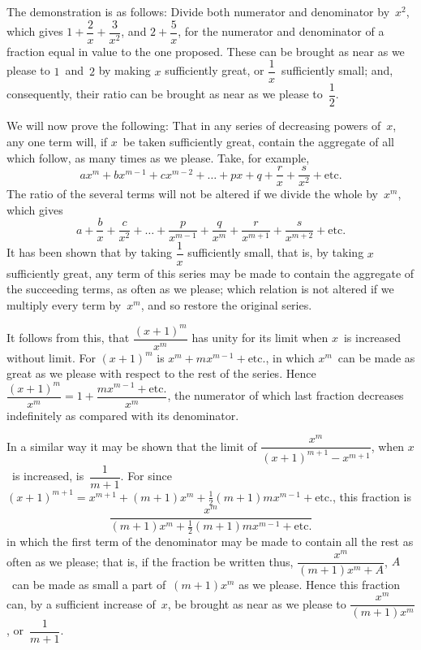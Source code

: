 \documentclass[12pt]{book}[2005/09/16]
\newcommand{\Pagelabel}[1]{\phantomsection\label{page:#1}}
\newcommand{\PageSep}[1]{\Pagelabel{#1}\ignorespaces}
\renewcommand{\etc}{\text{etc}}
\renewcommand{\(}{{\upshape(}}
\renewcommand{\)}{{\upshape)}}
\begin{document}
The demonstration is as follows: Divide both
numerator and denominator by~$x^{2}$, which gives $1 + \dfrac{2}{x} + \dfrac{3}{x^{2}}$,
and $2 + \dfrac{5}{x}$, for the numerator and denominator
of a fraction equal in value to the one proposed.
These can be brought as near as we please to $1$~and~$2$
by making $x$ sufficiently great, or $\dfrac{1}{x}$~sufficiently small;
and, consequently, their ratio can be brought as near
as we please to~$\dfrac{1}{2}$.

We will now prove the following: That in any
series of decreasing powers of~$x$, any one term will, if
$x$~be taken sufficiently great, contain the aggregate of
all which follow, as many times as we please. Take,
for example,
\[
ax^{m} + bx^{m-1} + cx^{m-2} + \dots + px + q
  + \frac{r}{x} + \frac{s}{x^{2}} + \etc.
\]
\PageSep{67}
The ratio of the several terms will not be altered if we
divide the whole by~$x^{m}$, which gives
\[
a + \frac{b}{x} + \frac{c}{x^{2}} + \dots
  + \frac{p}{x^{m-1}} + \frac{q}{x^{m}}  + \frac{r}{x^{m+1}}
  + \frac{s}{x^{m+2}} + \etc.
\]
It has been shown that by taking $\dfrac{1}{x}$ sufficiently small,
that is, by taking $x$ sufficiently great, any term of this
series may be made to contain the aggregate of the
succeeding terms, as often as we please; which relation
is not altered if we multiply every term by~$x^{m}$,
and so restore the original series.

It follows from this, that $\dfrac{(x + 1)^{m}}{x^{m}}$ has unity for its
limit when $x$~is increased without limit. For $(x + 1)^{m}$
is $x^{m} + mx^{m-1} + \etc.$, in which $x^{m}$~can be made as
great as we please with respect to the rest of the
series. Hence $\dfrac{(x + 1)^{m}}{x^{m}} = 1 + \dfrac{mx^{m-1} + \etc.}{x^{m}}$, the numerator
of which last fraction decreases indefinitely
as compared with its denominator.

In a similar way it may be shown that the limit of
$\dfrac{x^{m}}{(x + 1)^{m+1} - x^{m+1}}$, when $x$~is increased, is~$\dfrac{1}{m + 1}$. For
since $(x + 1)^{m+1} = x^{m+1} + (m + 1)x^{m} + \frac{1}{2}(m + 1)m x^{m-1} + \etc.$,
this fraction is
\[
\frac{x^{m}}{(m + 1)x^{m} + \frac{1}{2}(m + 1)m x^{m-1} + \etc.}
\]
in which the first term of the denominator may be
made to contain all the rest as often as we please;
that is, if the fraction be written thus, $\dfrac{x^{m}}{(m + 1)x^{m} + A}$,
$A$~can be made as small a part of~$(m + 1)x^{m}$ as we
\PageSep{68}
please. Hence this fraction can, by a sufficient increase
of~$x$, be brought as near as we please to
$\dfrac{x^{m}}{(m + 1)x^{m}}$, or~$\dfrac{1}{m + 1}$.
\end{document}
